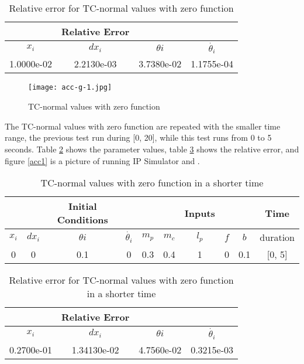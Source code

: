 \documentclass[12pt, titlepage]{article}
\begin{document}
\begin{table}[ht]
\caption{Relative error for TC-normal values with zero function} 
\label{zfr}
\vspace*{2mm}
\centering
 \begin{tabular}{|c c c c|} 
 \hline
&\textbf{Relative Error}&&\\ \hline
$x_i$&$dx_i$&$\theta{i}$&$\dot{\theta_{i}}$ \\ \hline
  1.0000e-02 & 2.2130e-03 & 3.7380e-02 &  1.1755e-04
\\ \hline
\end{tabular}
\end{table}	


\begin{figure}[H]
\begin{center}
\texttt{[image: acc-g-1.jpg]}
 \caption{TC-normal values with zero function}
 \label{zf1}
 \end{center}
 \end{figure}


The TC-normal values with zero function are repeated with the smaller time range, the previous test run during [0, 20], while this test runs from 0 to 5 seconds. Table \ref{timestepV} shows the parameter values, table \ref{timestepV_res} shows the relative error, and figure \ref{acc1} is a picture of running IP Simulator and \cite{al-khazraji_2022}.


\begin{table}[ht]
\caption{TC-normal values with zero function in a shorter time} \label{timestepV}
\vspace*{2mm}
\centering
 \begin{tabular}{|c c c c|c c c c c|c|} 
 \hline
&&\textbf{Initial Conditions}& &  &  &  \textbf{Inputs} &  &&\textbf{Time}  \\ \hline
$x_i$&$dx_i$&$\theta{i}$&$\dot{\theta_{i}}$ & $m_p$ & $m_c$ & $l_p$ & $f$ & $b$  & duration \\ \hline
0 & 0 & 0.1 & 0 & 0.3 & 0.4 & 1 & 0 & 0.1 &[0, 5]\\
 \hline
\end{tabular}
\end{table}	

\begin{table}[ht]
\caption{Relative error for TC-normal values with zero function in a shorter time} \label{timestepV_res}
\vspace*{2mm}
\centering
 \begin{tabular}{|c c c c|} 
 \hline
&\textbf{Relative Error}&&\\ \hline
$x_i$&$dx_i$&$\theta{i}$&$\dot{\theta_{i}}$ \\ \hline
  0.2700e-01 & 1.34130e-02 & 4.7560e-02 &  0.3215e-03
\\ \hline
\end{tabular}
\end{table}	
\end{document}
